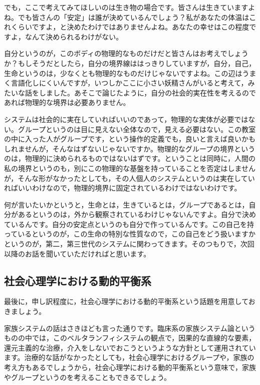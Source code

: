 \documentclass{ltjsbook}
\begin{document}
でも，ここで考えてみてほしいのは生き物の場合です。皆さんは生きていますよね。でも皆さんの「安定」は誰が決めているんでしょう？私があなたの体温はこれくらいですよ，と決めたわけではありませんよね。あなたの幸せはこの程度ですよ，なんて決められるわけがない。

自分というのが，このボディの物理的なものだけだと皆さんはお考えでしょうか？もしそうだとしたら，自分の境界線ははっきりしていますが，自分，自己，生命というのは，少なくとも物理的なものだけじゃないですよね。この辺はうまく言語化しにくいんですが，いつしかここに小さい妖精さんがいると考えて，みたいな話をしました。あそこで論じたように，自分の社会的実在性を考えるのであれば物理的な境界は必要ありません。

システムは社会的に実在していればいいのであって，物理的な実体が必要ではない。グループというのは目に見えない全体なので，見える必要はない。この教室の中に入った人がグループです，という操作的定義でも，良いと言えば良いかもしれませんが，そんなはずないじゃないですか。物理的なグループの境界というのは，物理的に決められるものではないはずです。ということは同時に，人間の私の境界というのも，別にこの物理的な基盤を持っていることを否定はしませんが，そんな形がなかったとしても，その人個人のシステムというのは実在していればいいわけなので，物理的境界に固定されているわけではないわけです。

何が言いたいかというと，生命とは，生きているとは，グループであるとは，自分があるというのは，外から観察されているわけじゃないんですよ。自分で決めているんです。自分の安定点というのも自分で作っているんです。この自己を持っているというのが，この生命の特別な性質なので，この自己をどう扱いますかというのが，第二，第三世代のシステムに関わってきます。そのつもりで，次回以降のお話を聞いていただければと思います。

\subsection{社会心理学における動的平衡系}
最後に，申し訳程度に，社会心理学における動的平衡系という話題を用意しておきましょう。

家族システムの話はさきほども言った通りです。臨床系の家族システム論というものの中では，このベルタランフィシステムの観点で，因果的な直線的な要素，還元主義的な治療，介入をしないでおこうというような方針として運用されています。治療的な話がなかったとしても，社会心理学におけるグループや，家族の考え方もあるでしょうから，社会心理学における動的平衡系という意味で，家族やグループというのを考えることもできるでしょう。
\end{document}
